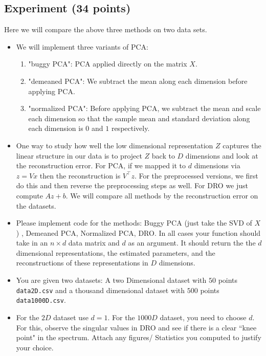 \documentclass[a4paper]{article}
\theoremstyle{definition}
\begin{document}
\subsection{Experiment (34 points)}

Here we will compare the above three methods on two data sets.

\begin{itemize}
	\item We will implement three variants of PCA:
	      \begin{enumerate}
		      \item "buggy PCA": PCA applied directly on the matrix $X$.
		      \item "demeaned PCA": We subtract the mean along each dimension before applying PCA.
		      \item "normalized PCA": Before applying PCA, we subtract the mean and scale each dimension so that the sample  mean and standard deviation along each dimension is $0$ and $1$ respectively.

	      \end{enumerate}



	\item
	      One way to study how well the low dimensional representation $Z$ captures the linear
	      structure in our data is to project $Z$ back to $D$ dimensions and look at the reconstruction
	      error. For PCA, if we mapped it to $d$ dimensions via $z = Vx$ then the
	      reconstruction is $V^\top z$. For the preprocessed versions, we first do this and then
	      reverse the preprocessing steps as well. For DRO  we just compute $Az + b$.
	      We will compare all methods by the reconstruction error on the datasets.

	\item
	      Please implement code for the methods: Buggy PCA (just take the SVD of $X$)
	      , Demeaned PCA,
	      Normalized PCA, DRO. In all cases your function should take in
	      an $n \times d$ data matrix and $d$ as an argument. It should return the
	      the $d$ dimensional representations, the estimated parameters, and the
	      reconstructions of these representations in $D$ dimensions.

	\item
	      You are given two datasets: A two Dimensional dataset with $50$ points
	      \texttt{data2D.csv} and a thousand dimensional dataset with $500$ points
	      \texttt{data1000D.csv}.

	\item
	      For the $2D$ dataset use $d=1$. For the $1000D$ dataset, you need to choose
	      $d$. For this, observe the singular values in DRO and see if there is a clear
	      ``knee point" in the spectrum.
	      Attach any figures/ Statistics you computed to justify your choice.


\end{itemize}
\end{document}
